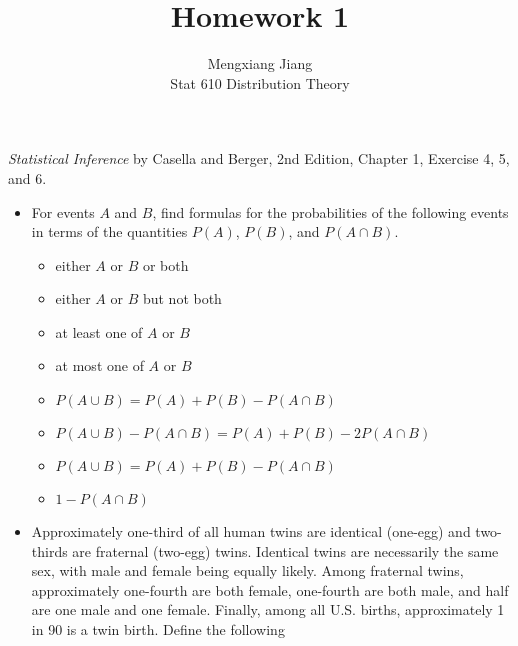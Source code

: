 \documentclass[12pt]{article}
\newenvironment{problem}[2][Problem]{\begin{trivlist}
\item[\hskip \labelsep {\bfseries #1}\hskip \labelsep {\bfseries #2.}]}
{\end{trivlist}}
\begin{document}
 
 
\title{Homework 1}%
\author{Mengxiang Jiang\\ %
Stat 610 Distribution Theory} %
 
\maketitle
 
\begin{problem}{1} %
  \textit{Statistical Inference} by Casella and Berger, 2nd Edition, Chapter 1, 
  Exercise 4, 5, and 6.
  \begin{itemize}
    \item[4] For events $A$ and $B$, find formulas for the probabilities of the 
    following events in terms of the quantities $P(A)$, $P(B)$, and $P(A \cap B)$.
      \begin{itemize}
        \item[(a)] either $A$ or $B$ or both
        \item[(b)] either $A$ or $B$ but not both
        \item[(c)] at least one of $A$ or $B$
        \item[(d)] at most one of $A$ or $B$
      \end{itemize}
      \begin{itemize}
        \item[(a)] $P(A \cup B) = P(A) + P(B) - P(A \cap B)$
        \item[(b)] $P(A \cup B) - P(A \cap B) = P(A) + P(B) - 2P(A \cap B)$
        \item[(c)] $P(A \cup B) = P(A) + P(B) - P(A \cap B)$
        \item[(d)] $1 - P(A \cap B)$
      \end{itemize}
    \item[5] Approximately one-third of all human twins are identical 
    (one-egg) and two-thirds are fraternal (two-egg) twins. Identical twins 
    are necessarily the same sex, with male and female being equally likely.
    Among fraternal twins, approximately one-fourth are both female, one-fourth
    are both male, and half are one male and one female. Finally, among all
    U.S. births, approximately 1 in 90 is a twin birth. Define the following

\end{itemize}
\end{problem}
\end{document}
